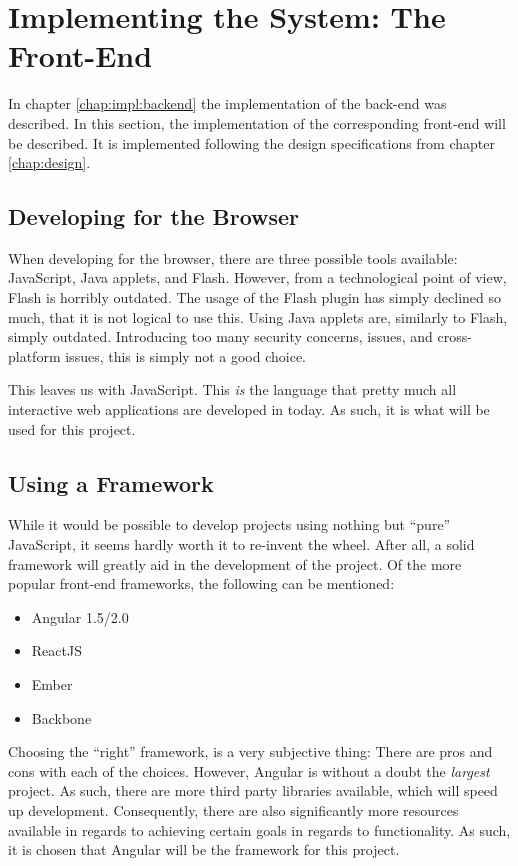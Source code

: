 \chapter{Implementing the System: The Front-End}
	In chapter \ref{chap:impl:backend} the implementation of the back-end was described. In this section, the implementation of the corresponding front-end will be described. It is implemented following the design specifications from chapter \ref{chap:design}.

	\section{Developing for the Browser}
		When developing for the browser, there are three possible tools available: JavaScript, Java applets, and Flash. However, from a technological point of view, Flash is horribly outdated. The usage of the Flash plugin has simply declined so much, that it is not logical to use this. Using Java applets are, similarly to Flash, simply outdated. Introducing too many security concerns, issues, and cross-platform issues, this is simply not a good choice.

		This leaves us with JavaScript. This \emph{is} the language that pretty much all interactive web applications are developed in today. As such, it is what will be used for this project.


	\section{Using a Framework}
		While it would be possible to develop projects using nothing but ``pure'' JavaScript, it seems hardly worth it to re-invent the wheel. After all, a solid framework will greatly aid in the development of the project. Of the more popular front-end frameworks, the following can be mentioned:
		\begin{itemize}
			\item Angular 1.5/2.0
			\item ReactJS
			\item Ember
			\item Backbone
		\end{itemize}
		Choosing the ``right'' framework, is a very subjective thing: There are pros and cons with each of the choices. However, Angular is without a doubt the \emph{largest} project. As such, there are more third party libraries available, which will speed up development. Consequently, there are also significantly more resources available in regards to achieving certain goals in regards to functionality. As such, it is chosen that Angular will be the framework for this project.


